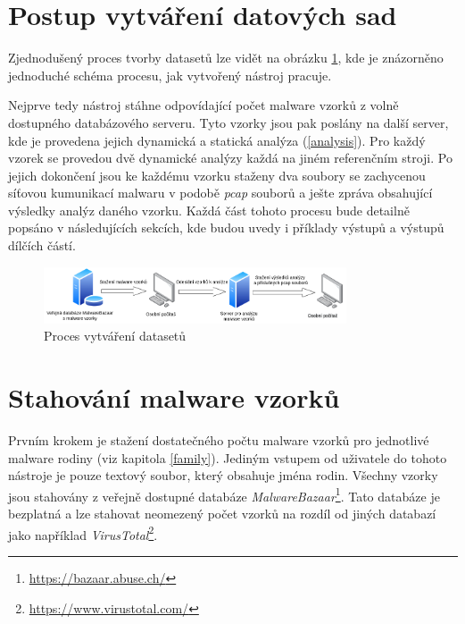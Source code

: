 
\section{Postup vytváření datových sad}
Zjednodušený proces tvorby datasetů lze vidět na obrázku \ref{pipeline}, kde je znázorněno jednoduché schéma procesu, jak vytvořený nástroj pracuje. 

Nejprve tedy nástroj stáhne odpovídající počet malware vzorků z volně dostupného databázového serveru. Tyto vzorky jsou pak poslány na další server, kde je provedena jejich dynamická a statická analýza (\ref{analysis}).
Pro každý vzorek se provedou dvě dynamické analýzy každá na jiném referenčním stroji.
Po jejich dokončení jsou ke každému vzorku staženy dva soubory se zachycenou síťovou kumunikací malwaru v podobě \textit{pcap} souborů a ješte zpráva obsahující výsledky analýz daného vzorku.
Každá část tohoto procesu bude detailně popsáno v následujících sekcích, kde budou uvedy i příklady výstupů a výstupů dílčích částí.\\

\begin{figure}[h]
	\centering
        \includegraphics[width=0.8\textwidth]{obrazky/pipeline.png}
	\caption{Proces vytváření datasetů}
    \label{pipeline}
\end{figure}

\section{Stahování malware vzorků}
Prvním krokem je stažení dostatečného počtu malware vzorků pro jednotlivé malware rodiny (viz kapitola \ref{family}). Jediným vstupem od uživatele do tohoto nástroje je pouze textový soubor, který obsahuje
jména rodin. Všechny vzorky jsou stahovány z veřejně dostupné databáze \textit{MalwareBazaar}\footnote{\href{https://bazaar.abuse.ch/}{https://bazaar.abuse.ch/}}. Tato databáze je 
bezplatná a lze stahovat neomezený počet vzorků na rozdíl od jiných databazí jako například \textit{VirusTotal}\footnote{\href{https://www.virustotal.com/gui/home/upload}{https://www.virustotal.com/}}.

